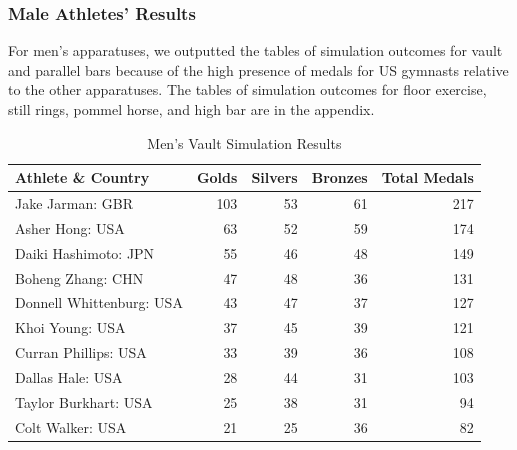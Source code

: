 \documentclass[
  letterpaper,
  DIV=11,
  numbers=noendperiod]{scrartcl}
\begin{document}
\hypertarget{male-athletes-results}{%
\subsubsection{Male Athletes' Results}\label{male-athletes-results}}

For men's apparatuses, we outputted the tables of simulation outcomes
for vault and parallel bars because of the high presence of medals for
US gymnasts relative to the other apparatuses. The tables of simulation
outcomes for floor exercise, still rings, pommel horse, and high bar are
in the appendix.

\begin{table}[H]

\caption{Men's Vault Simulation Results }
\centering
\fontsize{8}{10}\selectfont
\begin{tabular}[t]{l|r|r|r|r}
\hline
Athlete \& Country & Golds & Silvers & Bronzes & Total Medals\\
\hline
Jake Jarman: GBR & 103 & 53 & 61 & 217\\
\hline
Asher Hong: USA & 63 & 52 & 59 & 174\\
\hline
Daiki Hashimoto: JPN & 55 & 46 & 48 & 149\\
\hline
Boheng Zhang: CHN & 47 & 48 & 36 & 131\\
\hline
Donnell Whittenburg: USA & 43 & 47 & 37 & 127\\
\hline
Khoi Young: USA & 37 & 45 & 39 & 121\\
\hline
Curran Phillips: USA & 33 & 39 & 36 & 108\\
\hline
Dallas Hale: USA & 28 & 44 & 31 & 103\\
\hline
Taylor Burkhart: USA & 25 & 38 & 31 & 94\\
\hline
Colt Walker: USA & 21 & 25 & 36 & 82\\
\hline
\end{tabular}
\end{table}
\end{document}
